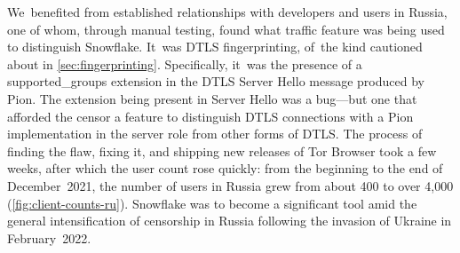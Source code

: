 \documentclass[letterpaper,twocolumn]{article}
\begin{document}
We~benefited from established relationships
with developers and users in Russia,
one of whom, through manual testing,
found what traffic feature was being used to distinguish Snowflake.
It~was DTLS fingerprinting,
of~the kind cautioned about in \autoref{sec:fingerprinting}.
Specifically, it~was the presence of a
\mbox{supported\_groups} extension in the DTLS Server Hello message produced by Pion.
The extension being present in Server Hello was a bug---but
one that afforded the censor a feature
to distinguish DTLS connections with a Pion implementation in the server role
from other forms of DTLS.
The process of finding the flaw, fixing it,
and shipping new releases of Tor Browser took a few weeks,
after which the user count rose quickly:
from the beginning to the end of December~2021,
the number of users in Russia grew from about 400 to over 4,000
(\autoref{fig:client-counts-ru}).
Snowflake was to become a significant tool
amid the general intensification of censorship in Russia
following the invasion of Ukraine in February~2022.
\end{document}
